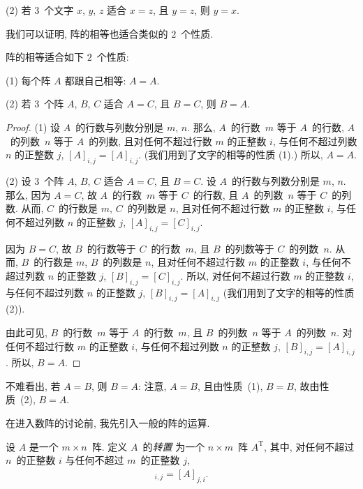\documentclass[../libro.tex]{subfiles}
\begin{document}
(2)
若 \(3\)~个文字 \(x\), \(y\), \(z\) 适合
\(x = z\), 且 \(y = z\),
则 \(y = x\).

我们可以证明, 阵的相等也适合类似的 \(2\)~个性质.

\begin{theorem}
    阵的相等适合如下 \(2\)~个性质:

    (1)
    每个阵 \(A\) 都跟自己相等: \(A = A\).

    (2)
    若 \(3\)~个阵 \(A\), \(B\), \(C\) 适合
    \(A = C\), 且 \(B = C\),
    则 \(B = A\).
\end{theorem}

\begin{proof}
    (1)
    设 \(A\)~的行数与列数分别是 \(m\), \(n\).
    那么,
    \(A\)~的行数~\(m\) 等于 \(A\)~的行数,
    \(A\)~的列数~\(n\) 等于 \(A\)~的列数,
    且对任何不超过行数 \(m\) 的正整数 \(i\),
    与任何不超过列数 \(n\) 的正整数 \(j\),
    \([A]_{i,j} = [A]_{i,j}\).
    (我们用到了文字的相等的性质 (1).)
    所以, \(A = A\).

    (2)
    设 \(3\)~个阵 \(A\), \(B\), \(C\) 适合
    \(A = C\), 且 \(B = C\).
    设 \(A\)~的行数与列数分别是 \(m\), \(n\).
    那么, 因为 \(A = C\),
    故
    \(A\)~的行数~\(m\) 等于 \(C\)~的行数,
    且 \(A\)~的列数~\(n\) 等于 \(C\)~的列数.
    从而,
    \(C\)~的行数是 \(m\), \(C\)~的列数是 \(n\),
    且对任何不超过行数 \(m\) 的正整数 \(i\),
    与任何不超过列数 \(n\) 的正整数 \(j\),
    \([A]_{i,j} = [C]_{i,j}\).

    因为 \(B = C\),
    故
    \(B\)~的行数等于 \(C\)~的行数~\(m\),
    且 \(B\)~的列数等于 \(C\)~的列数~\(n\).
    从而,
    \(B\)~的行数是 \(m\), \(B\)~的列数是 \(n\),
    且对任何不超过行数 \(m\) 的正整数 \(i\),
    与任何不超过列数 \(n\) 的正整数 \(j\),
    \([B]_{i,j} = [C]_{i,j}\).
    所以, 对任何不超过行数 \(m\) 的正整数 \(i\),
    与任何不超过列数 \(n\) 的正整数 \(j\),
    \([B]_{i,j} = [A]_{i,j}\)
    (我们用到了文字的相等的性质 (2)).

    由此可见,
    \(B\)~的行数~\(m\) 等于 \(A\)~的行数~\(m\),
    且 \(B\)~的列数~\(n\) 等于 \(A\)~的列数~\(n\).
    对任何不超过行数 \(m\) 的正整数 \(i\),
    与任何不超过列数 \(n\) 的正整数 \(j\),
    \([B]_{i,j} = [A]_{i,j}\).
    所以, \(B = A\).
\end{proof}

不难看出, 若 \(A = B\), 则 \(B = A\):
注意, \(A = B\),
且由性质~(1), \(B = B\),
故由性质~(2), \(B = A\).

在进入数阵的讨论前,
我先引入一般的阵的运算.

\begin{definition}[转置]
    设 \(A\) 是一个 \(m \times n\)~阵.
    定义 \(A\)~的\emph{转置}%
    为一个 \(n \times m\)~阵 \(A^{\mathrm{T}}\),
    其中, 对任何不超过 \(n\)~的正整数 \(i\)
    与任何不超过 \(m\)~的正整数 \(j\),
    \begin{align*}
        [A^{\mathrm{T}}]_{i,j} = [A]_{j,i}.
    \end{align*}
\end{definition}
\end{document}
